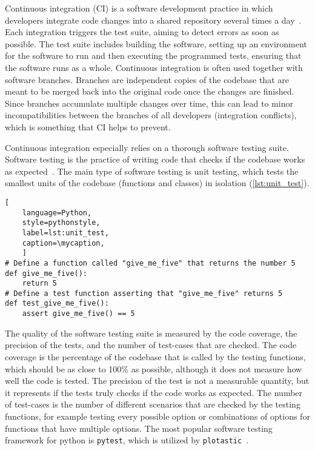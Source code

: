 Continuous integration (CI) is a software development practice in which
developers integrate code changes into a shared repository several times a
day~\cite{duvall2007continuous}. Each integration triggers the test suite,
aiming to detect errors as soon as possible. The test suite includes building
the software, setting up an environment for the software to run and then
executing the programmed tests, ensuring that the software runs as a whole.
Continuous integration is often used together with software branches. Branches
are independent copies of the codebase that are meant to be merged back into the
original code once the changes are finished. Since branches accumulate multiple
changes over time, this can lead to minor incompatibilities between the branches
of all developers (integration conflicts), which is something that CI helps to
prevent.

Continuous integration especially relies on a thorough software testing suite.
Software testing is the practice of writing code that checks if the codebase
works as expected~\cite{10.5555/2161638}. The main type of software testing is
unit testing, which tests the smallest units of the codebase (functions and
classes) in isolation (\autoref{lst:unit_test}).

\def\mycaption{ Example of an arbitrary python function and its respective unit
    test function. The first function simply returns the number 5. The second
    function tests if the first function indeed returns the number 5. The test
    function is named with the prefix ``\texttt{test\_}'' and is placed in a
    file that ends with the suffix ``\texttt{\_test.py}''. The test function is
    executed by the testing framework \texttt{pytest}. Note that code after
    ``\texttt{\#}'' is considered a comment and won't be executed.}
\begin{lstlisting}[
    language=Python, 
    style=pythonstyle,
    label=lst:unit_test, 
    caption=\mycaption,
    ]
# Define a function called "give_me_five" that returns the number 5
def give_me_five():
    return 5
# Define a test function asserting that "give_me_five" returns 5
def test_give_me_five():
    assert give_me_five() == 5 
\end{lstlisting}

The quality of the software testing suite is measured by the code coverage, the
precision of the tests, and the number of test-cases that are checked. The code
coverage is the percentage of the codebase that is called by the testing
functions, which should be as close to 100\% as possible, although it does not
measure how well the code is tested. The precision of the test is not a
measurable quantity, but it represents if the tests truly checks if the code
works as expected. The number of test-cases is the number of different scenarios
that are checked by the testing functions, for example testing every possible
option or combinations of options for functions that have multiple options. The
most popular software testing framework for python is \texttt{pytest}, which is
utilized by \texttt{plotastic}~\cite{pytestx.y}.

